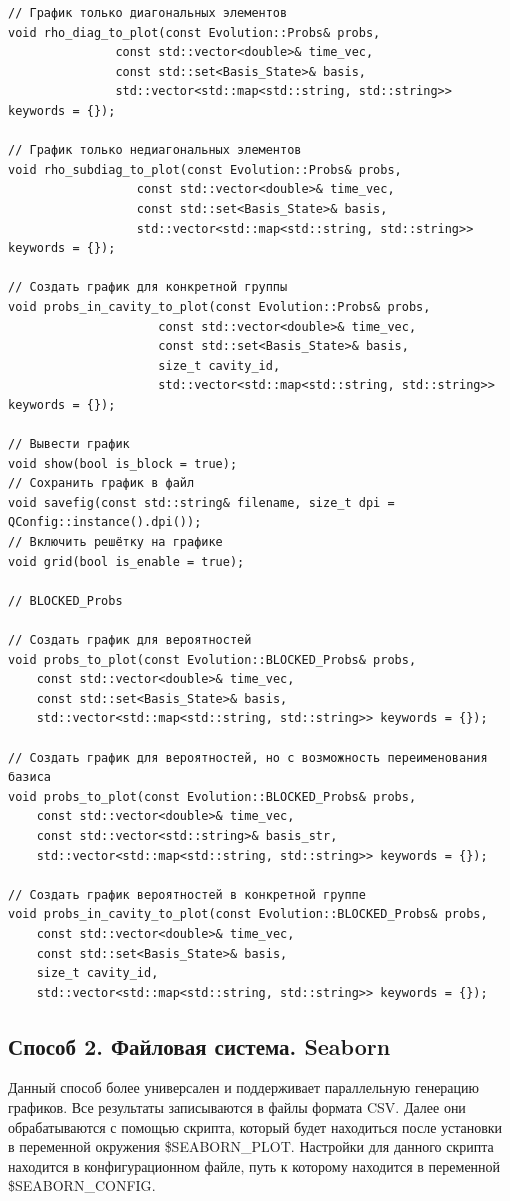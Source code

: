 \documentclass[12pt,fleqn]{article}
\begin{document}
\begin{mdframed}[linecolor=black, topline=true, bottomline=true,
    leftline=false, rightline=false]
\begin{verbatim}
// График только диагональных элементов
void rho_diag_to_plot(const Evolution::Probs& probs,
               const std::vector<double>& time_vec,
               const std::set<Basis_State>& basis,
               std::vector<std::map<std::string, std::string>> keywords = {});

// График только недиагональных элементов
void rho_subdiag_to_plot(const Evolution::Probs& probs,
                  const std::vector<double>& time_vec,
                  const std::set<Basis_State>& basis,
                  std::vector<std::map<std::string, std::string>> keywords = {});

// Создать график для конкретной группы
void probs_in_cavity_to_plot(const Evolution::Probs& probs,
                     const std::vector<double>& time_vec,
                     const std::set<Basis_State>& basis,
                     size_t cavity_id,
                     std::vector<std::map<std::string, std::string>> keywords = {});

// Вывести график
void show(bool is_block = true);
// Сохранить график в файл
void savefig(const std::string& filename, size_t dpi = QConfig::instance().dpi());
// Включить решётку на графике
void grid(bool is_enable = true);

// BLOCKED_Probs

// Создать график для вероятностей
void probs_to_plot(const Evolution::BLOCKED_Probs& probs,
    const std::vector<double>& time_vec,
    const std::set<Basis_State>& basis,
    std::vector<std::map<std::string, std::string>> keywords = {});

// Создать график для вероятностей, но с возможность переименования базиса
void probs_to_plot(const Evolution::BLOCKED_Probs& probs,
    const std::vector<double>& time_vec,
    const std::vector<std::string>& basis_str,
    std::vector<std::map<std::string, std::string>> keywords = {});

// Создать график вероятностей в конкретной группе
void probs_in_cavity_to_plot(const Evolution::BLOCKED_Probs& probs,
    const std::vector<double>& time_vec,
    const std::set<Basis_State>& basis,
    size_t cavity_id,
    std::vector<std::map<std::string, std::string>> keywords = {});
\end{verbatim}
\end{mdframed}

        \subsection{Способ 2. Файловая система. \textsf{Seaborn}}
        Данный способ более универсален и поддерживает параллельную генерацию графиков. Все результаты записываются в файлы формата CSV.
         Далее они обрабатываются с помощью скрипта, который будет находиться после установки в переменной окружения \textsf{\$SEABORN\_PLOT}. Настройки для 
         данного скрипта находится в конфигурационном файле, путь к которому находится в переменной \textsf{\$SEABORN\_CONFIG}.
\end{document}
